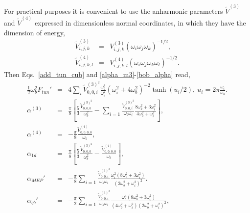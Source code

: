 \documentclass[journal=jpcafh,manuscript=article]{achemso}
\begin{document}
For practical purposes it is convenient to use the anharmonic
parameters $\tilde{V}^{(3)}$ and $\tilde{V}^{(4)}$ expressed in dimensionless normal coordinates,\cite{papousek82}
in which they have the dimension of energy,
\begin{eqnarray}
  \label{m3_red}
  \tilde{V}^{(3)}_{i,j,k}&=&V^{(3)}_{i,j,k}(\omega_i\omega_j\omega_k)^{-1/2},
  \\
  \label{m4_red}
  \tilde{V}^{(4)}_{i,j,k,l}&=&V^{(4)}_{i,j,k,l}(\omega_i\omega_j\omega_k\omega_l)^{-1/2}.
\end{eqnarray}
Then Eqs.~\ref{add_tun_cub} and \ref{alpha_m3}-\ref{bob_alpha} read,
\begin{eqnarray}
  \label{add_tun_red}
  \frac{1}{2}\omega_b^2F_{tun}'&=&4\sum_i\tilde{V}^{(3)^2}_{0,0,i}\frac{\omega_b^4}{\omega_i^2}(\omega_i^2+4\omega_b^2)^{-2}\tanh(u_i/2),\
              u_i=2\pi\frac{\omega_i}{\omega_b}.
  \\
  \label{alpha_m3_red}
  \alpha^{(3)}&=&\frac{\pi}{8}\left[\frac{5}{3}\frac{\tilde{V}_{0,0,0}^{(3)^2}}{\omega_b^2}
            -\sum_{i=1}\frac{\tilde{V}_{0,0,i}^{(3)^2}}{\omega_b\omega_i}\frac{8\omega_b^2+3\omega_i^2}{4\omega_b^2+\omega_i^2}\right],
  \\
  \label{alpha_m4_red}
  \alpha^{(4)}&=&-\frac{\pi}{8}\frac{\tilde{V}_{0,0,0,0}^{(4)}}{\omega_b},
  \\
  \label{one_alpha_red}
  \alpha_{1d}&=&\frac{\pi}{8}\left[\frac{5}{3}\frac{\tilde{V}_{0,0,0}^{(3)^2}}{\omega_b^2}-\frac{\tilde{V}_{0,0,0,0}^{(4)}}{\omega_b}\right],
  \\
  \label{mep_alpha_red}
  \alpha_{MEP}'&=&-\frac{\pi}{8}\sum_{i=1}\frac{\tilde{V}_{0,0,i}^{(3)^2}}{\omega_b\omega_i}
  \frac{\omega_i^2(8\omega_b^2+3\omega_i^2)}{(2\omega_b^2+\omega_i^2)^2}.
  \\
  \label{bob_alpha_red}
  \alpha_{qb}'&=&-\frac{\pi}{2}\sum_{i=1}\frac{\tilde{V}_{0,0,i}^{(3)^2}}{\omega_b\omega_i}
  \frac{\omega_b^4(8\omega_b^2+3\omega_i^2)}{(4\omega_b^2+\omega_i^2)(2\omega_b^2+\omega_i^2)^2},
\end{eqnarray}
\end{document}
